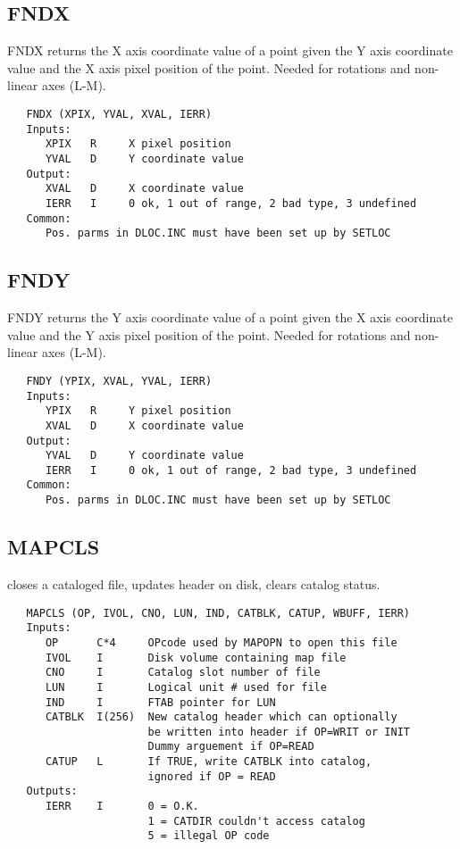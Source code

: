 \subsection{FNDX}
FNDX returns the X axis coordinate value of a point given the Y
axis coordinate value and the X axis pixel position of the point.
Needed for rotations and non-linear axes (L-M).
\begin{verbatim}
   FNDX (XPIX, YVAL, XVAL, IERR)
   Inputs:
      XPIX   R     X pixel position
      YVAL   D     Y coordinate value
   Output:
      XVAL   D     X coordinate value
      IERR   I     0 ok, 1 out of range, 2 bad type, 3 undefined
   Common:
      Pos. parms in DLOC.INC must have been set up by SETLOC
\end{verbatim}

\subsection{FNDY}
FNDY returns the Y axis coordinate value of a point given the X
axis coordinate value and the Y axis pixel position of the point.
Needed for rotations and non-linear axes (L-M).
\begin{verbatim}
   FNDY (YPIX, XVAL, YVAL, IERR)
   Inputs:
      YPIX   R     Y pixel position
      XVAL   D     X coordinate value
   Output:
      YVAL   D     Y coordinate value
      IERR   I     0 ok, 1 out of range, 2 bad type, 3 undefined
   Common:
      Pos. parms in DLOC.INC must have been set up by SETLOC
\end{verbatim}

\subsection{MAPCLS}
closes a cataloged file, updates header on disk, clears catalog
status.
\begin{verbatim}
   MAPCLS (OP, IVOL, CNO, LUN, IND, CATBLK, CATUP, WBUFF, IERR)
   Inputs:
      OP      C*4     OPcode used by MAPOPN to open this file
      IVOL    I       Disk volume containing map file
      CNO     I       Catalog slot number of file
      LUN     I       Logical unit # used for file
      IND     I       FTAB pointer for LUN
      CATBLK  I(256)  New catalog header which can optionally
                      be written into header if OP=WRIT or INIT
                      Dummy arguement if OP=READ
      CATUP   L       If TRUE, write CATBLK into catalog,
                      ignored if OP = READ
   Outputs:
      IERR    I       0 = O.K.
                      1 = CATDIR couldn't access catalog
                      5 = illegal OP code
\end{verbatim}


